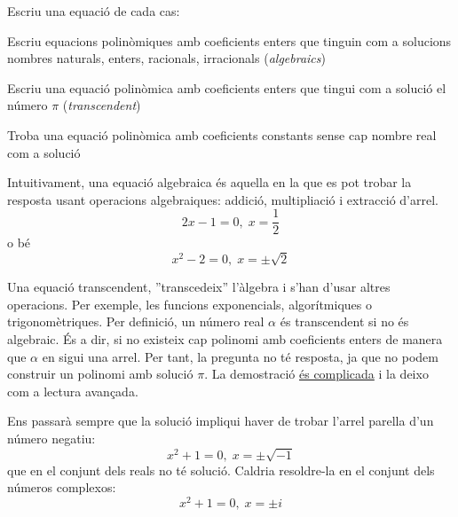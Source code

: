 \Exercise Escriu una equació de cada cas:
\begin{llista}
    \item Escriu equacions polinòmiques amb coeficients enters que tinguin com a solucions nombres naturals, enters, racionals, irracionals (\textit{algebraics})
    \item Escriu una equació polinòmica amb coeficients enters que tingui com a solució el número $\pi$ (\textit{transcendent})
    \item Troba una equació polinòmica amb coeficients constants sense cap nombre real com a  solució
\end{llista}

\Answer 
\begin{llista}
  \item Intuitivament, una equació algebraica és aquella en la que es pot trobar la resposta usant operacions algebraiques: addició, multipliació i extracció d'arrel.
  \[2x-1=0, \; x=\frac{1}{2}\]
  o bé
  \[x^2-2=0, \; x=\pm\sqrt{2}\]
  \item Una equació transcendent, ''transcedeix'' l'àlgebra i s'han d'usar altres operacions. Per exemple, les funcions exponencials, algorítmiques o trigonomètriques. Per definició, un número real $\alpha$ és transcendent si no és algebraic. És a dir, si no existeix cap polinomi amb coeficients enters de manera que $\alpha$ en sigui una arrel. Per tant, la pregunta no té resposta, ja que no podem construir un polinomi amb solució $\pi$. La demostració \href{https://www.gaussianos.com/como-demostrar-que-%CF%80-pi-es-trascendente/}{és complicada} i la deixo com a lectura avançada.
  \item Ens passarà sempre que la solució impliqui haver de trobar l'arrel parella d'un número negatiu:
  \[x^2+1=0, \; x=\pm\sqrt{-1}\]
  que en el conjunt dels reals no té solució. Caldria resoldre-la en el conjunt dels números complexos:
  \[x^2+1=0, \; x=\pm i\]
\end{llista}
\blacksquare